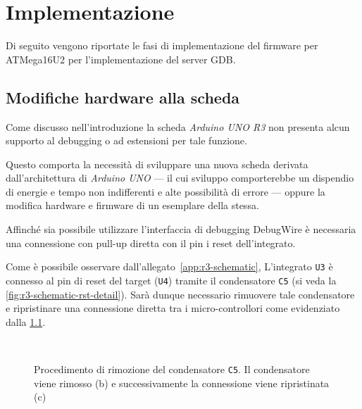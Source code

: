 \chapter{Implementazione}

Di seguito vengono riportate le fasi di implementazione del firmware per ATMega16U2 per l'implementazione del server GDB.\@ 

\section{Modifiche hardware alla scheda}\label{s:dw-board-mod}

Come discusso nell'introduzione la scheda \textit{Arduino UNO R3} non presenta alcun supporto al debugging o ad estensioni per tale funzione.

Questo comporta la necessità di sviluppare una nuova scheda derivata dall'architettura di \textit{Arduino UNO} --- il cui sviluppo comporterebbe un dispendio di energie e tempo non indifferenti e alte possibilità di errore --- oppure la modifica hardware e firmware di un esemplare della stessa.

Affinché sia possibile utilizzare l'interfaccia di debugging DebugWire è necessaria una connessione con pull-up diretta con il pin i reset dell'integrato.

Come è possibile osservare dall'allegato~\ref{app:r3-schematic}, L'integrato \texttt{U3} è connesso al pin di reset del target (\texttt{U4}) tramite il condensatore \texttt{C5} (si veda la \cref{fig:r3-schematic-rst-detail}). Sarà dunque necessario rimuovere tale condensatore e ripristinare una connessione diretta tra i micro-controllori come evidenziato dalla \cref{fig:remove-c5}.

\begin{figure}[t]
    \hfill
    \begin{minipage}{.45\textwidth}
    \end{minipage}
    \begin{minipage}{.45\textwidth}
         \\
    \end{minipage}
    \hfill
    \caption[]{Procedimento di rimozione del condensatore \texttt{C5}. Il condensatore viene rimosso (b) e successivamente la connessione viene ripristinata (c)}\label{fig:remove-c5}
\end{figure}


